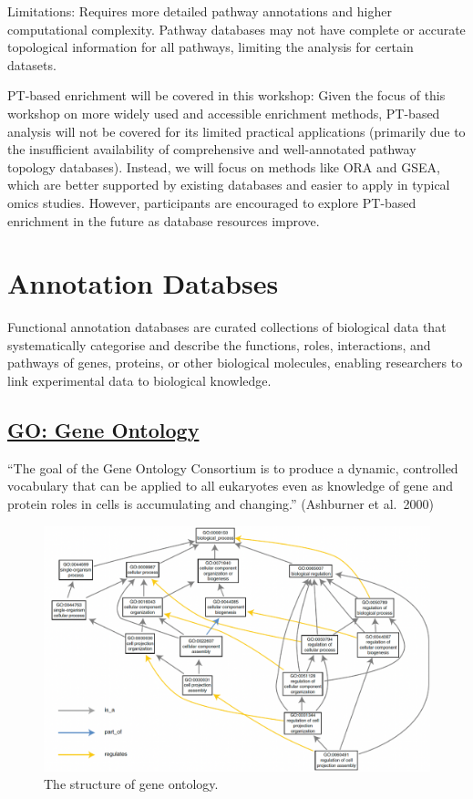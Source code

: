 \documentclass[
]{book}
\begin{document}
{Limitations}: Requires more detailed pathway annotations and higher computational complexity. Pathway databases may not have complete or accurate topological information for all pathways, limiting the analysis for certain datasets.

PT-based enrichment will be covered in this workshop:
Given the focus of this workshop on more widely used and accessible enrichment methods, PT-based analysis will not be covered for its limited practical applications (primarily due to the insufficient availability of comprehensive and well-annotated pathway topology databases). Instead, we will focus on methods like ORA and GSEA, which are better supported by existing databases and easier to apply in typical omics studies. However, participants are encouraged to explore PT-based enrichment in the future as database resources improve.

\hypertarget{annotation-databses}{%
\section{Annotation Databses}\label{annotation-databses}}

Functional annotation databases are curated collections of biological data that systematically categorise and describe the functions, roles, interactions, and pathways of genes, proteins, or other biological molecules, enabling researchers to link experimental data to biological knowledge.

\hypertarget{go-gene-ontology}{%
\subsection{\texorpdfstring{\href{https://geneontology.org/}{GO: Gene Ontology}}{GO: Gene Ontology}}\label{go-gene-ontology}}

``The goal of the Gene Ontology Consortium is to produce a dynamic, controlled vocabulary that can be applied to all eukaryotes even as knowledge of gene and protein roles in cells is accumulating and changing.'' (Ashburner et al.~2000)

\begin{figure}

{\centering \includegraphics[width=1\linewidth]{images/go_structure} 

}

\caption{The structure of gene ontology.}\label{fig:unnamed-chunk-7}
\end{figure}
\end{document}
